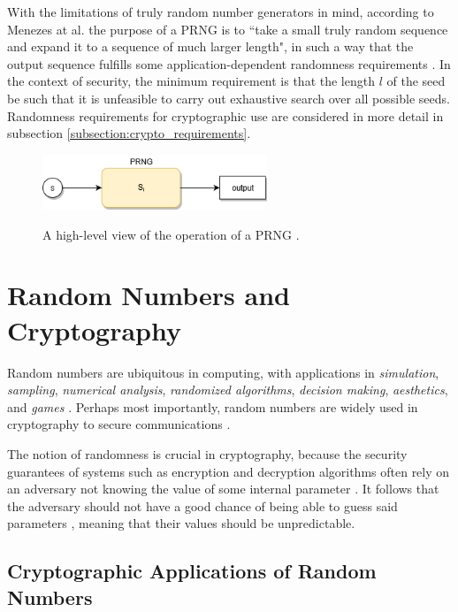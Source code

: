 \documentclass[12pt, titlepage]{report}
\theoremstyle{definition}
\begin{document}
With the limitations of truly random number generators in mind, according to Menezes at al. the purpose of a PRNG is to ``take a small truly random sequence and expand it to a sequence of much larger length", in such a way that the output sequence fulfills some application-dependent randomness requirements \cite[p. 170]{menezes1996handbook}. In the context of security, the minimum requirement is that the length $l$ of the seed be such that it is unfeasible to carry out exhaustive search over all possible seeds. Randomness requirements for cryptographic use are considered in more detail in subsection \ref{subsection:crypto_requirements}.

\begin{figure}
\centering
\includegraphics[width=0.6\textwidth]{img/conceptual_prng.png}\\
\caption{A high-level view of the operation of a PRNG \cite{kelsey1998cryptanalytic}.}
\label{figure:prng_high_level}
\end{figure}



\section{Random Numbers and Cryptography}
Random numbers are ubiquitous in computing, with applications in \emph{simulation}, \emph{sampling}, \emph{numerical analysis}, \emph{randomized algorithms}, \emph{decision making}, \emph{aesthetics}, and \emph{games} \cite[p. 1-2]{donald1998art}. Perhaps most importantly, random numbers are widely used in cryptography to secure communications \cite[p. 137]{ferguson2010cryptography}.

The notion of randomness is crucial in cryptography, because the security guarantees of systems such as encryption and decryption algorithms often rely on an adversary not knowing the value of some internal parameter \cite[p. 169]{menezes1996handbook} \cite[p. 1]{kelsey1998cryptanalytic}. It follows that the adversary should not have a good chance of being able to guess said parameters \cite[p. 2]{kelsey1998cryptanalytic}, meaning that their values should be unpredictable.


\subsection{Cryptographic Applications of Random Numbers}
\end{document}
